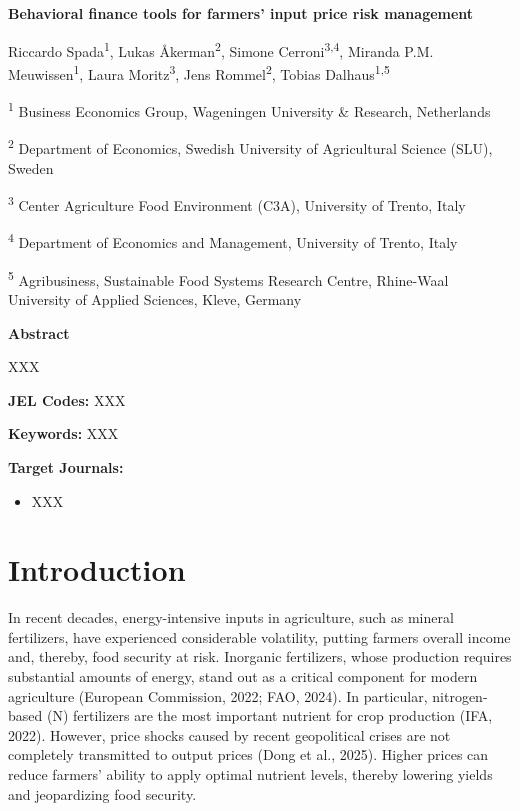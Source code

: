 \documentclass[
]{article}
\author{}
\date{}
\begin{document}
\textbf{Behavioral finance tools for farmers' input price risk
management}

Riccardo Spada\textsuperscript{1}, Lukas Åkerman\textsuperscript{2},
Simone Cerroni\textsuperscript{3,4}, Miranda P.M.
Meuwissen\textsuperscript{1}, Laura Moritz\textsuperscript{3}, Jens
Rommel\textsuperscript{2}, Tobias Dalhaus\textsuperscript{1,5}

\textsuperscript{1} Business Economics Group, Wageningen University \&
Research, Netherlands

\textsuperscript{2} Department of Economics, Swedish University of
Agricultural Science (SLU), Sweden

\textsuperscript{3} Center Agriculture Food Environment (C3A),
University of Trento, Italy

\textsuperscript{4} Department of Economics and Management, University
of Trento, Italy

\textsuperscript{5} Agribusiness, Sustainable Food Systems Research
Centre, Rhine-Waal University of Applied Sciences, Kleve, Germany

\textbf{Abstract}

XXX

\textbf{JEL Codes:} XXX

\textbf{Keywords:} XXX

\textbf{Target Journals:}

\begin{itemize}
\item
  XXX
\end{itemize}

\section{Introduction}\label{introduction}

In recent decades, energy-intensive inputs in agriculture, such as
mineral fertilizers, have experienced considerable volatility, putting
farmers\textquotesingle{} overall income and, thereby, food security at
risk. Inorganic fertilizers, whose production requires substantial
amounts of energy, stand out as a critical component for modern
agriculture (European Commission, 2022; FAO, 2024). In particular,
nitrogen-based (N) fertilizers are the most important nutrient for crop
production (IFA, 2022). However, price shocks caused by recent
geopolitical crises are not completely transmitted to output prices
(Dong et al., 2025). Higher prices can reduce farmers' ability to apply
optimal nutrient levels, thereby lowering yields and jeopardizing food
security.
\end{document}
